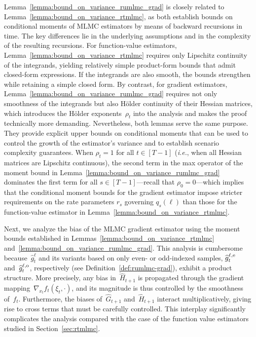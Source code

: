 \documentclass[11pt]{article}
\let\hat\widehat
\begin{document}
Lemma~\ref{lemma:bound_on_variance_rumlmc_grad} is closely related to Lemma~\ref{lemma:bound_on_variance_rtmlmc}, as both establish bounds on conditional moments of MLMC estimators by means of backward recursions in time. The key differences lie in the underlying assumptions and in the complexity of the resulting recursions. For function-value estimators, Lemma~\ref{lemma:bound_on_variance_rtmlmc} requires only Lipschitz continuity of the integrands, yielding relatively simple product-form bounds that admit closed-form expressions. If the integrands are also smooth, the bounds strengthen while retaining a simple closed form. By contrast, for gradient estimators, Lemma~\ref{lemma:bound_on_variance_rumlmc_grad} requires not only smoothness of the integrands but also Hölder continuity of their Hessian matrices, which introduces the Hölder exponents~$\rho_t$ into the analysis and makes the proof technically more demanding. Nevertheless, both lemmas serve the same purpose. They provide explicit upper bounds on conditional moments that can be used to control the growth of the estimator’s variance and to establish scenario complexity guarantees. When $\rho_t=1$ for all $t\in[T-1]$ ({\em i.e.}, when all Hessian matrices are Lipschitz continuous), the second term in the max operator of the moment bound in Lemma~\ref{lemma:bound_on_variance_rumlmc_grad} dominates the first term for all $s\in[T-1]$—recall that $\rho_{0}=0$—which implies that the conditional moment bounds for the gradient estimator impose stricter requirements on the rate parameters $r_s$ governing $q_s(\ell)$ than those for the function-value estimator in Lemma~\ref{lemma:bound_on_variance_rtmlmc}.



Next, we analyze the bias of the MLMC gradient estimator using the moment bounds established in Lemmas~\ref{lemma:bound_on_variance_rtmlmc} and~\ref{lemma:bound_on_variance_rumlmc_grad}. This analysis is cumbersome because~$\hat{g}_t^\ell$ and its variants based on only even- or odd-indexed samples, $\hat{g}_t^{\ell, {\rm e}}$ and~$\hat{g}_t^{\ell, {\rm o}}$, respectively (see Definition~\ref{def:rumlmc-grad}), exhibit a product structure. More precisely, any bias in~$\hat{H}_{t+1}$ is propagated through the gradient mapping~$\nabla_{x_t} f_t(\xi_t,\cdot)$, and its magnitude is thus controlled by the smoothness of~$f_t$. Furthermore, the biases of~$\hat{G}_{t+1}$ and~$\hat{H}_{t+1}$ interact multiplicatively, giving rise to cross terms that must be carefully controlled. This interplay significantly complicates the analysis compared with the case of the function value estimators studied in Section~\ref{sec:rtmlmc}.
\end{document}
